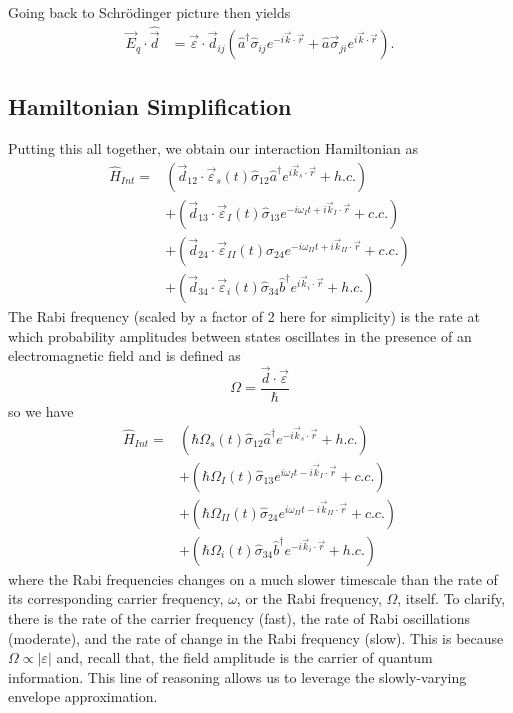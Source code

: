 \documentclass[aps,pra,showpacs,amsmath,amssymb,nofootinbib,longbibliography,superscriptaddress
]{revtex4-1}
\theoremstyle{definition}
\theoremstyle{remark}
\newcommand{\0}{\hat{0}}
\begin{document}
Going back to Schr\"{o}dinger picture then yields
\begin{align}
    \vec{E}_q \cdot \hat{\vec{d}} &=
    \vec{\varepsilon} \cdot \vec{d}_{ij}\left(
        \hat{a}^{\dagger} \hat{\sigma}_{ij} e^{-i \vec{k} \cdot \vec{r}} +
        \hat{a} \vec{\sigma}_{ji} e^{i \vec{k} \cdot \vec{r}}
    \right).
\end{align}

\subsection{Hamiltonian Simplification}

Putting this all together, we obtain our interaction Hamiltonian as
\begin{align}
    \hat{H}_{Int} = 
    &\left(\vec{d}_{12} \cdot \vec{\varepsilon}_{s}(t) \hat{\sigma}_{12} \hat{a}^{\dagger} e^{i \vec{k}_{s} \cdot \vec{r}} + h.c.\right)\nonumber \\
    &+ \left(\vec{d}_{13} \cdot \vec{\varepsilon}_I(t) \hat{\sigma}_{13} e^{-i \omega_I t + i \vec{k}_I \cdot \vec{r}} + c.c.\right)\nonumber \\
    &+ \left(\vec{d}_{24} \cdot \vec{\varepsilon}_{II}(t) \hat{\sigma}_{24} e^{-i \omega_{II} t + i \vec{k}_{II} \cdot \vec{r}} + c.c.\right)\nonumber \\
    &+ \left(\vec{d}_{34} \cdot \vec{\varepsilon}_{i}(t) \hat{\sigma}_{34} \hat{b}^{\dagger} e^{i \vec{k}_{i} \cdot \vec{r}} + h.c.\right)
\end{align}
The Rabi frequency (scaled by a factor of 2 here for simplicity) is the rate at which probability amplitudes between states oscillates in the presence of an electromagnetic field \cite{Tong} and is defined as
\begin{equation}
    \Omega = \frac{\vec{d} \cdot \vec{\varepsilon}}{\hbar}
\end{equation}
so we have
\begin{align}
    \hat{H}_{Int} =
    &\left(\hbar \Omega_{s}(t) \hat{\sigma}_{12} \hat{a}^{\dagger} e^{-i \vec{k}_{s} \cdot \vec{r}} + h.c.\right)\nonumber \\
    &+ \left(\hbar \Omega_{I}(t) \hat{\sigma}_{13} e^{i \omega_I t - i \vec{k}_I \cdot \vec{r}} + c.c.\right)\nonumber \\
    &+ \left(\hbar \Omega_{II}(t) \hat{\sigma}_{24} e^{i \omega_{II} t - i \vec{k}_{II} \cdot \vec{r}} + c.c.\right)\nonumber \\
    &+ \left(\hbar \Omega_{i}(t) \hat{\sigma}_{34} \hat{b}^{\dagger} e^{-i \vec{k}_{i} \cdot \vec{r}} + h.c.\right)
\end{align}
where the Rabi frequencies changes on a much slower timescale than the rate of its corresponding carrier frequency, $\omega$, or the Rabi frequency, $\Omega$, itself. To clarify, there is the rate of the carrier frequency (fast), the rate of Rabi oscillations (moderate), and the rate of change in the Rabi frequency (slow). This is because $\Omega \propto |\varepsilon|$ and, recall that, the field amplitude is the carrier of quantum information. This line of reasoning allows us to leverage the slowly-varying envelope approximation.
\end{document}
